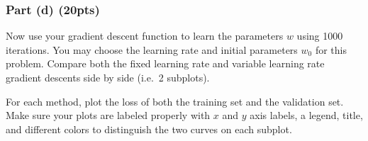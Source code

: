 \documentclass[11pt]{article}
\begin{document}
    \hypertarget{part-d-20pts}{%
\subsubsection{Part (d) (20pts)}\label{part-d-20pts}}

Now use your gradient descent function to learn the parameters \(w\)
using 1000 iterations. You may choose the learning rate and initial
parameters \(w_0\) for this problem. Compare both the fixed learning
rate and variable learning rate gradient descents side by side (i.e.~2
subplots).

For each method, plot the loss of both the training set and the
validation set. Make sure your plots are labeled properly with \(x\) and
\(y\) axis labels, a legend, title, and different colors to distinguish
the two curves on each subplot.
\end{document}
